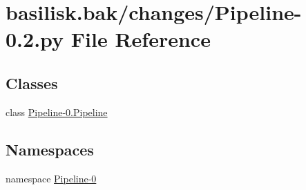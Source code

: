 \hypertarget{basilisk_8bak_2changes_2_pipeline-0_82_8py}{\section{basilisk.\-bak/changes/\-Pipeline-\/0.2.py \-File \-Reference}
\label{basilisk_8bak_2changes_2_pipeline-0_82_8py}
}
\subsection*{\-Classes}
\begin{DoxyCompactItemize}
\item 
class \hyperlink{class_pipeline-0_1_1_pipeline}{\-Pipeline-\/0.\-Pipeline}
\end{DoxyCompactItemize}
\subsection*{\-Namespaces}
\begin{DoxyCompactItemize}
\item 
namespace \hyperlink{namespace_pipeline-0}{\-Pipeline-\/0}
\end{DoxyCompactItemize}
